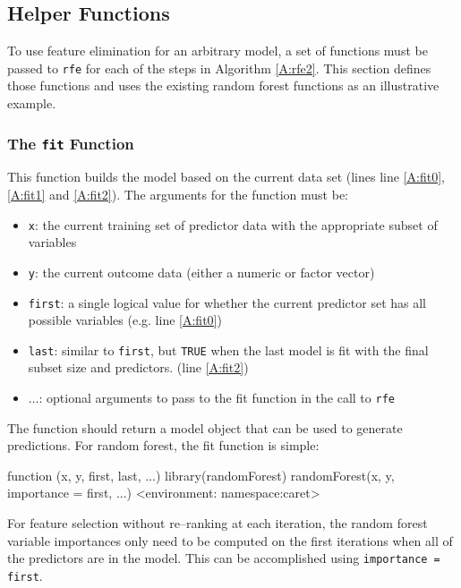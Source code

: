 \documentclass[12pt]{article}
\begin{document}
\subsection{Helper Functions}\label{S:helpers}

To use feature elimination for an arbitrary model, a set of functions must be passed to \texttt{rfe} for each of the steps in Algorithm  \ref{A:rfe2}. This section defines those functions and uses the existing random forest functions as an illustrative example.

\subsubsection{The \texttt{fit} Function}

This function builds the model based on the current data set (lines line \ref{A:fit0},  \ref{A:fit1} and \ref{A:fit2}). The arguments for the function must be:
\begin{itemize}
\item \texttt{x}: the current training set of predictor data with the appropriate subset of variables
\item \texttt{y}: the current outcome data (either a numeric or factor vector)
\item \texttt{first}: a single logical value for whether the current predictor set has all possible variables (e.g. line \ref{A:fit0})
  \item \texttt{last}: similar to \texttt{first}, but \texttt{TRUE} when the last model is fit with the final subset size and predictors. (line \ref{A:fit2}) 
\item $\ldots$: optional arguments to pass to the fit function in the call to \texttt{rfe}
\end{itemize}
The function should return a model object that can be used to generate predictions. For random forest, the fit function is simple:
\begin{Schunk}
\begin{Soutput}
function (x, y, first, last, ...) 
{
    library(randomForest)
    randomForest(x, y, importance = first, ...)
}
<environment: namespace:caret>
\end{Soutput}
\end{Schunk}
For feature selection without re--ranking at each iteration, the random forest variable importances only need to be computed on the first iterations when all of the predictors are in the model. This can be accomplished using  \texttt{importance = first}.
\end{document}
